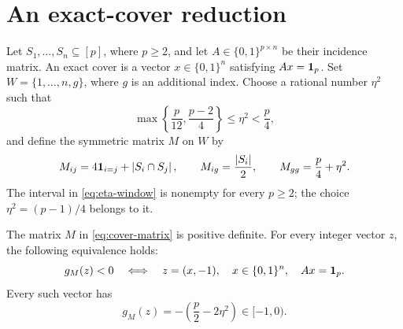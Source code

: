 \section{An exact-cover reduction}\label{sec:core}

Let $S_1,\ldots,S_n\subseteq[p]$, where $p\geq2$, and let
$A\in\{0,1\}^{p\times n}$ be their incidence matrix.  An exact cover is a
vector $x\in\{0,1\}^n$ satisfying $Ax=\mathbf 1_p$.  Set
$W=\{1,\ldots,n,g\}$, where $g$ is an additional index.  Choose a rational
number $\eta^2$ such that
\begin{equation}\label{eq:eta-window}
  \max\left\{\frac p{12},\frac{p-2}{4}\right\}
  \leq\eta^2<\frac p4,
\end{equation}
and define the symmetric matrix $M$ on $W$ by
\begin{equation}\label{eq:cover-matrix}
  M_{ij}=4\mathbf 1_{i=j}+\left\lvert S_i\cap S_j\right\rvert,\qquad
  M_{ig}=\frac{\left\lvert S_i\right\rvert}2,\qquad
  M_{gg}=\frac p4+\eta^2.
\end{equation}
The interval in \eqref{eq:eta-window} is nonempty for every $p\geq2$;
the choice $\eta^2=(p-1)/4$ belongs to it.

\begin{theorem}\label{thm:exact-cover}
The matrix $M$ in \eqref{eq:cover-matrix} is positive definite.  For
every integer vector $z$, the following equivalence holds:
\begin{equation}\label{eq:cover-violators}
  g_M(z)<0
  \quad\Longleftrightarrow\quad
  z=(x,-1),\quad x\in\{0,1\}^n,\quad Ax=\mathbf 1_p.
\end{equation}
Every such vector has
\[
  g_M(z)=-\left(\frac p2-2\eta^2\right)\in[-1,0).
\]
\end{theorem}

